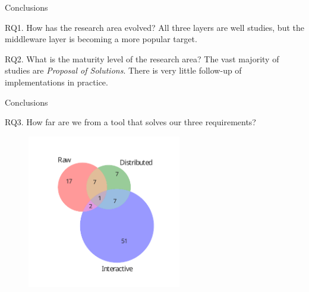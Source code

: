 \documentclass[10pt]{beamer}
\begin{document}
\begin{frame}{Conclusions}
    \begin{block}{RQ1. How has the research area evolved?}
        \smallskip
        All three layers are well studies, but the middleware layer is becoming a more popular target.
    \end{block}
    \begin{block}{RQ2. What is the maturity level of the research area?}
        \smallskip
        The vast majority of studies are \emph{Proposal of Solutions}. There is very little follow-up of implementations in practice.
    \end{block}
\end{frame}

\begin{frame}{Conclusions}
    \begin{block}{RQ3. How far are we from a tool that solves our three requirements?}
        \begin{figure}
            \centering
            \includegraphics[width=0.6\textwidth]{venn.pdf}
        \end{figure}
    \end{block}
\end{frame}
\end{document}
